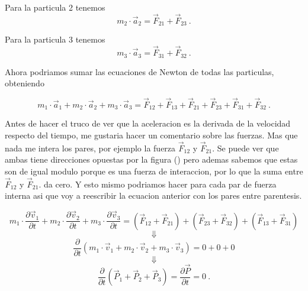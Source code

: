 \documentclass[../Main.tex]{subfiles}
\begin{document}
\begin{minipage}[t]{0.6\textwidth}

Para la particula 2 tenemos
\begin{equation*}
    m_2 \cdot \vec{a} _2 = \vec{F} _{21} + \vec{F} _{23} \ .
\end{equation*}

Para la particula 3 tenemos
\begin{equation*}
    m_3 \cdot \vec{a} _3 = \vec{F} _{31} + \vec{F} _{32} \ .
\end{equation*}

Ahora podriamos sumar las ecuaciones de Newton de todas las particulas,
obteniendo

\begin{equation*}
     m_1 \cdot \vec{a} _1 + m_2 \cdot \vec{a} _2 + m_3 \cdot \vec{a} _3 = \vec{F} _{12} + \vec{F} _{13} + \vec{F} _{21} + \vec{F} _{23} + \vec{F} _{31} + \vec{F} _{32} \ .
\end{equation*}

Antes de hacer el truco de ver que la aceleracion es la derivada de la
velocidad respecto del tiempo, me gustaria hacer un comentario sobre las
fuerzas. Mas que nada me intera los pares, por ejemplo la fuerza $\vec{F} _{12}$
y $\vec{F} _{21} $. Se puede ver que ambas tiene direcciones opuestas por la
figura () pero ademas sabemos que estas son de igual modulo porque es una
fuerza de interaccion, por lo que la suma entre $\vec{F} _{12}$ y $\vec{F} _{21}$.
da cero. Y esto mismo podriamos hacer para cada par de fuerza interna asi que
voy a reescribir la ecuacion anterior con los pares entre parentesis.

\begin{equation*}
     m_1 \cdot \frac{\partial \vec{v} _1}{\partial t} + m_2 \cdot \frac{\partial \vec{v} _2}{\partial t} + m_3 \cdot \frac{\partial \vec{v} _3}{\partial t} = (\vec{F} _{12} + \vec{F} _{21}) + (\vec{F} _{23} + \vec{F} _{32}) + (\vec{F} _{13} + \vec{F} _{31})
\end{equation*}
\begin{equation*}
    \Downarrow
\end{equation*}
\begin{equation*}
   \frac{\partial}{\partial t} \left(m_1 \cdot \vec{v} _1 + m_2 \cdot \vec{v} _2 + m_3 \cdot \vec{v} _3 \right) =  0 + 0 + 0
\end{equation*}
\begin{equation*}
    \Downarrow
\end{equation*}
\begin{equation}
    \frac{\partial}{\partial t} \left(\vec{P} _1 + \vec{P} _2 + \vec{P} _3 \right) = \frac{\partial \vec{P}}{\partial t} = 0 \ .
\end{equation}


\end{minipage}
\end{document}
